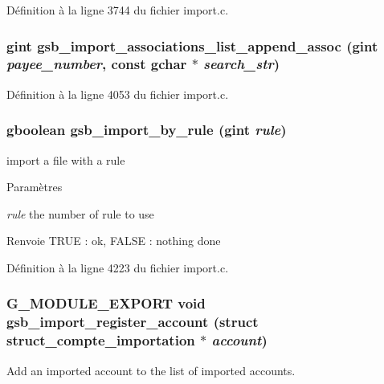 Définition à la ligne 3744 du fichier import.c.

\subsubsection[{gsb\_\-import\_\-associations\_\-list\_\-append\_\-assoc}]{\setlength{\rightskip}{0pt plus 5cm}gint gsb\_\-import\_\-associations\_\-list\_\-append\_\-assoc (gint {\em payee\_\-number}, \/  const gchar $\ast$ {\em search\_\-str})}\label{import_8c_ac714bc1d2307956bd5172caaa39c1c21}


Définition à la ligne 4053 du fichier import.c.

\subsubsection[{gsb\_\-import\_\-by\_\-rule}]{\setlength{\rightskip}{0pt plus 5cm}gboolean gsb\_\-import\_\-by\_\-rule (gint {\em rule})}\label{import_8c_a83937dc8d19317b124055841c3fd61a6}
import a file with a rule


\begin{DoxyParams}{Paramètres}
\item[{\em rule}]the number of rule to use\end{DoxyParams}
\begin{DoxyReturn}{Renvoie}
TRUE : ok, FALSE : nothing done 
\end{DoxyReturn}


Définition à la ligne 4223 du fichier import.c.

\subsubsection[{gsb\_\-import\_\-register\_\-account}]{\setlength{\rightskip}{0pt plus 5cm}G\_\-MODULE\_\-EXPORT void gsb\_\-import\_\-register\_\-account (struct {\bf struct\_\-compte\_\-importation} $\ast$ {\em account})}\label{import_8c_a20d9d366175a0b8a38fb710d74df63b4}
Add an imported account to the list of imported accounts.


